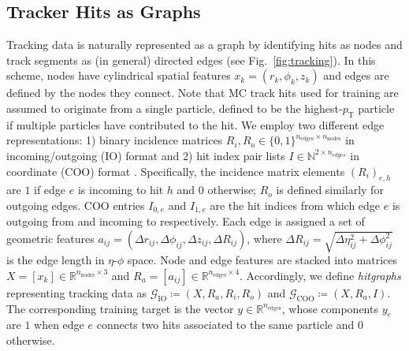 \documentclass[twocolumn]{svjour3}
\newcommand{\pt}{\ensuremath{p_{\mathrm{T}}}\xspace}
\newcommand{\nnodes}{\ensuremath{n_\mathrm{nodes}\xspace}}
\newcommand{\nedges}{\ensuremath{n_\mathrm{edges}\xspace}}
\begin{document}
\subsection{Tracker Hits as Graphs}
Tracking data is naturally represented as a graph by identifying hits as nodes and track segments as (in general) directed edges (see Fig.~\ref{fig:tracking}). 
In this scheme, nodes have cylindrical spatial features $x_k=(r_k,\phi_k,z_k)$ and edges are defined by the nodes they connect.
Note that MC track hits used for training are assumed to originate from a single particle, defined to be the highest-\pt particle if multiple particles have contributed to the hit.
We employ two different edge representations: 1) binary incidence matrices $R_i, R_o\in\{0,1\}^{\nedges\times \nnodes}$ in incoming/outgoing (IO) format and 2) hit index pair lists $I\in\mathbb{N}^{2\times n_{edges}}$ in coordinate (COO) format \cite{fey2019fast}.
Specifically, the incidence matrix elements $(R_i)_{e,h}$ are $1$ if edge $e$ is incoming to hit $h$ and $0$ otherwise; $R_o$ is defined similarly for outgoing edges. 
COO entries $I_{0,e}$ and $I_{1,e}$ are the hit indices from which edge $e$ is outgoing from and incoming to respectively.
Each edge is assigned a set of geometric features $a_{ij} = (\Delta r_{ij}, \Delta \phi_{ij}, \Delta z_{ij}, \Delta R_{ij})$, where $\Delta R_{ij}=\sqrt{\Delta\eta_{ij}^2 + \Delta\phi_{ij}^2}$ is the edge length in $\eta$-$\phi$ space. 
Node and edge features are stacked into matrices $X = [x_k]\in\mathbb{R}^{\nnodes\times 3}$ and $R_a=[a_{ij}]\in\mathbb R^{\nedges\times 4}$. 
Accordingly, we define \textit{hitgraphs} representing tracking data as $\mathcal{G}_\mathrm{IO}\coloneqq (X, R_a, R_i, R_o)$ and $\mathcal{G}_\mathrm{COO}\coloneqq (X,R_a,I)$. 
The corresponding training target is the vector $y\in\mathbb{R}^{\nedges}$, whose components $y_e$ are $1$ when edge $e$ connects two hits associated to the same particle and $0$ otherwise.
\end{document}

